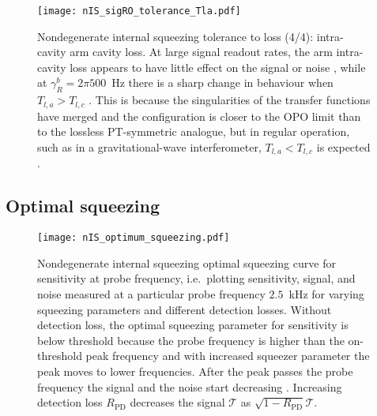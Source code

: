 \begin{figure}
	\centering
	\texttt{[image: nIS\_sigRO\_tolerance\_Tla.pdf]}
	\caption{ Nondegenerate internal squeezing tolerance to loss (4/4): intra-cavity arm cavity loss. At large signal readout rates, the arm intra-cavity loss appears to have little effect on the signal or noise , while at $\gamma^b_R=2\pi 500$~Hz there is a sharp change in behaviour when $T_{l,a}>T_{l,c}$ . This is because the singularities of the transfer functions have merged and the configuration is closer to the OPO limit than to the lossless PT-symmetric analogue, but in regular operation, such as in a gravitational-wave interferometer, $T_{l,a}<T_{l,c}$ is expected .}
	\label{fig:nIS_sigRO_tolerance_Tla}
\end{figure}





\subsection{Optimal squeezing}

\begin{figure}
	\centering
	\texttt{[image: nIS\_optimum\_squeezing.pdf]}
	\caption{  Nondegenerate internal squeezing optimal squeezing curve for sensitivity at probe frequency, i.e.\ plotting sensitivity, signal, and noise measured at a particular probe frequency $2.5$~kHz for varying squeezing parameters and different detection losses. Without detection loss, the optimal squeezing parameter for sensitivity is below threshold because the probe frequency is higher than the on-threshold peak frequency and with increased squeezer parameter the peak moves to lower frequencies. After the peak passes the probe frequency  the signal and the noise start decreasing . Increasing detection loss $R_\text{PD}$ decreases the signal $\mathcal{T}$ as $\sqrt{1-R_\text{PD}}\mathcal{T}$.}
	\label{fig:}
\end{figure}

